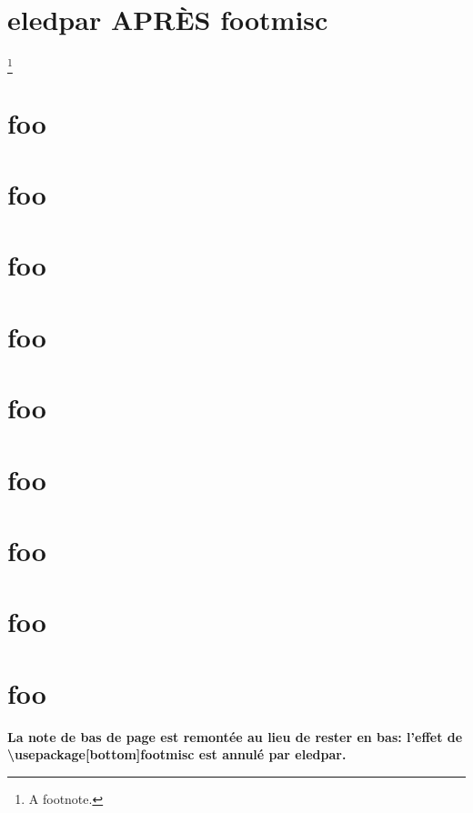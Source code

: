 \documentclass{book}
\begin{document}
\section{eledpar APRÈS footmisc}

\kant[1-3]

\begin{pairs}
\begin{Leftside}
  \beginnumbering
  \pstart\kant[2]\footnote{A footnote.}\kant[3]\pend
  \endnumbering
\end{Leftside}
\begin{Rightside}
  \beginnumbering
  \pstart\kant[5]\pend
  \endnumbering
\end{Rightside}
\Columns
\end{pairs}

\section{foo}
\section{foo}
\section{foo}
\section{foo}
\section{foo}
\section{foo}
\section{foo}
\section{foo}
\section{foo}

\bigskip

\Large\bf La note de bas de page est remontée au lieu de rester en bas: l’effet
de \textbackslash{}usepackage[bottom]{footmisc} est annulé par eledpar.
\end{document}
